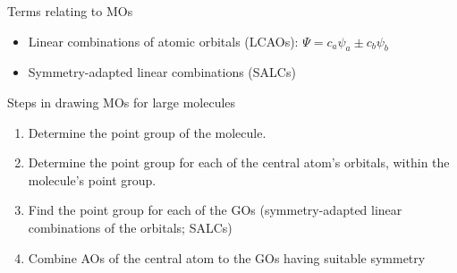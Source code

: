 \documentclass[10pt,landscape]{article}
\begin{document}
\begin{multicols}{3}
Terms relating to MOs
\begin{itemize}
	\item Linear combinations of atomic orbitals (LCAOs): $\Psi = c_a \psi_a \pm c_b \psi_b$
	\item Symmetry-adapted linear combinations (SALCs)
\end{itemize}

Steps in drawing MOs for large molecules
\begin{enumerate}
	\item Determine the point group of the molecule.
	\item Determine the point group for each of the central atom's orbitals, within the molecule's point group.
	\item Find the point group for each of the GOs (symmetry-adapted linear combinations of the orbitals; SALCs) 
	\item Combine AOs of the central atom to the GOs having suitable symmetry
\end{enumerate}

\hrulefill
\end{multicols}
\end{document}
